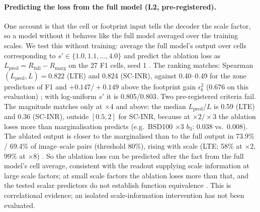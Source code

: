 \paragraph{Predicting the loss from the full model (L2, pre-registered).}
One account is that the cell or footprint input tells the
decoder the scale factor, so a model without it behaves like the full model
averaged over the training scales. We test this without training: average
the full model's output over cells corresponding to $s'\in\{1.0,1.1,\dots,4.0\}$
and predict the ablation loss as $L_{\mathrm{pred}}=R_{\mathrm{full}}-R_{\mathrm{marg}}$
on the 27 F1 cells, seed 1 . The ranking matches:
Spearman$(L_{\mathrm{pred}},L)=0.822$ (LTE) and 0.824 (SC-INR), against
0.40--0.49 for the zone predictors of F1 and $+0.147/+0.149$ above the
footprint gain $\epsilon_b^2$ (0.676 on this evaluation) ; with
log-uniform $s'$ it is 0.805/0.803. Two pre-registered criteria fail. The
magnitude matches only at $\times4$ and above: the median
$L_{\mathrm{pred}}/L$ is 0.59 (LTE) and 0.36 (SC-INR), outside $[0.5,2]$ for
SC-INR, because at $\times2/\times3$ the ablation loses more than
marginalisation predicts (e.g.\ BSD100 $\times3$ $b_3$: 0.038 vs.\ 0.008).
The ablated output is closer to the marginalised than to the full output in
73.9\% / 69.4\% of image--scale pairs (threshold 80\%), rising with scale
(LTE: 58\% at $\times2$, 99\% at $\times8$) . So the ablation loss can be predicted after the fact
from the full model's cell average, consistent with the readout supplying
scale information at large scale factors; at small scale factors the ablation
loses more than that, and the tested scalar predictors do not establish function equivalence
. This is correlational evidence; an isolated scale-information intervention has not been evaluated.

